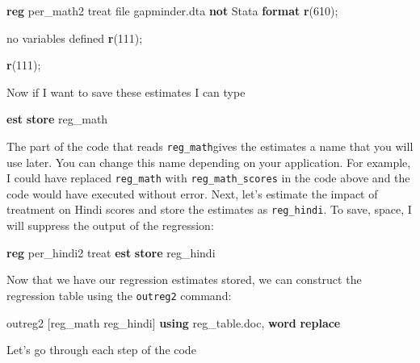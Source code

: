 \documentclass[
]{book}
\newenvironment{Shaded}{\begin{snugshade}}{\end{snugshade}}
\newcommand{\FunctionTok}[1]{\textcolor[rgb]{0.13,0.29,0.53}{\textbf{#1}}}
\newcommand{\KeywordTok}[1]{\textcolor[rgb]{0.13,0.29,0.53}{\textbf{#1}}}
\newcommand{\NormalTok}[1]{#1}
\begin{document}
\begin{Shaded}
\begin{Highlighting}[]
\KeywordTok{reg}\NormalTok{ per\_math2 treat}
\NormalTok{file gapminder.dta }\KeywordTok{not}\NormalTok{ Stata }\KeywordTok{format}
\FunctionTok{r}\NormalTok{(610);}


\NormalTok{no variables defined}
\FunctionTok{r}\NormalTok{(111);}

\FunctionTok{r}\NormalTok{(111);}
\end{Highlighting}
\end{Shaded}

Now if I want to save these estimates I can type

\begin{Shaded}
\begin{Highlighting}[]
\KeywordTok{est} \KeywordTok{store}\NormalTok{ reg\_math}
\end{Highlighting}
\end{Shaded}

The part of the code that reads \texttt{reg\_math}gives the estimates a name that you will use later. You can change this name depending on your application. For example, I could have replaced \texttt{reg\_math} with \texttt{reg\_math\_scores} in the code above and the code would have executed without error. Next, let's estimate the impact of treatment on Hindi scores and store the estimates as \texttt{reg\_hindi}. To save, space, I will suppress the output of the regression:

\begin{Shaded}
\begin{Highlighting}[]
\KeywordTok{reg}\NormalTok{ per\_hindi2 treat}
\KeywordTok{est} \KeywordTok{store}\NormalTok{ reg\_hindi}
\end{Highlighting}
\end{Shaded}

Now that we have our regression estimates stored, we can construct the regression table using the \texttt{outreg2} command:

\begin{Shaded}
\begin{Highlighting}[]
\NormalTok{outreg2 [reg\_math reg\_hindi] }\KeywordTok{using}\NormalTok{ reg\_table.doc, }\FunctionTok{word} \KeywordTok{replace}
\end{Highlighting}
\end{Shaded}

Let's go through each step of the code
\end{document}
